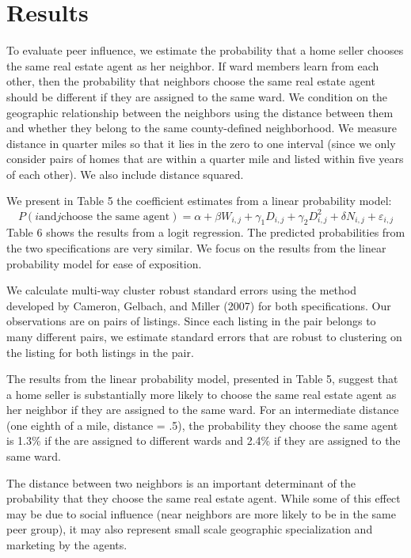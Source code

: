 \documentclass[12pt]{article}
\begin{document}
\section*{Results}
    To evaluate peer influence, we estimate the probability that a home seller chooses the same real estate agent as her neighbor. If ward members
    learn from each other, then the probability that neighbors choose the same real estate agent should be different if they are assigned to the same
    ward. We condition on the geographic relationship between the neighbors using the distance between them and whether they belong to the same
    county-defined neighborhood. We measure distance in quarter miles so that it lies in the zero to one interval (since we only consider pairs of
    homes that are within a quarter mile and listed within five years of each other). We also include distance squared.

    We present in Table 5 the coefficient estimates from a linear probability model:
    \[P(i \textrm{and} j \textrm{choose the same agent}) 
            = \alpha + \beta W_{i,j} + \gamma_1 D_{i,j} + \gamma_2 D^2_{i,j} + \delta N_{i,j} + \varepsilon_{i,j}\]
    Table 6 shows the results from a logit regression. The predicted
    probabilities from the two specifications are very similar. We focus on the results from the linear probability model for ease of exposition.

    We calculate multi-way cluster robust standard errors using the method developed by Cameron, Gelbach, and Miller (2007) for both specifications.
    Our observations are on pairs of listings. Since each listing in the pair belongs to many different pairs, we estimate standard errors that are
    robust to clustering on the listing for both listings in the pair.

    The results from the linear probability model, presented in Table 5, suggest that a home seller is substantially more likely to choose the same
    real estate agent as her neighbor if they are assigned to the same ward. For an intermediate distance (one eighth of a mile, distance = .5), the
    probability they choose the same agent is 1.3\% if the are assigned to different wards and 2.4\% if they are assigned to the same ward.
    
    The distance between two neighbors is an important determinant of the probability that they choose the same real estate agent. While some of this
    effect may be due to social influence (near neighbors are more likely to be in the same peer group), it may also represent small scale geographic
    specialization and marketing by the agents.
\end{document}
